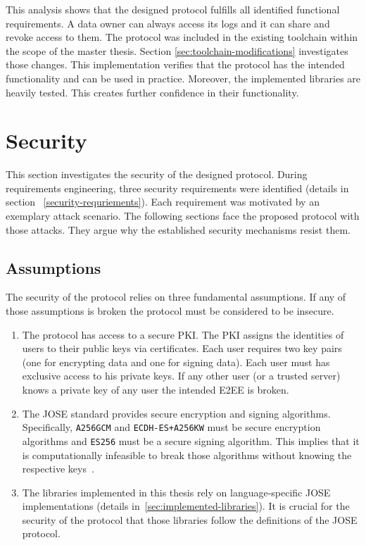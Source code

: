 \documentclass[../main.tex]{subfiles}
\begin{document}
This analysis shows that the designed protocol fulfills all identified functional requirements.
A data owner can always access its logs and it can share and revoke access to them.
The protocol was included in the existing toolchain within the scope of the master thesis.
Section \ref{sec:toolchain-modifications} investigates those changes.
This implementation verifies that the protocol has the intended functionality and can be used in practice.
Moreover, the implemented libraries are heavily tested.
This creates further confidence in their functionality.

\section{Security}
\label{sec:evaluation-sec}

This section investigates the security of the designed protocol.
During requirements engineering, three security requirements were identified (details in section ~\ref{security-requriements}).
Each requirement was motivated by an exemplary attack scenario.
The following sections face the proposed protocol with those attacks.
They argue why the established security mechanisms resist them.

\subsection{Assumptions}

The security of the protocol relies on three fundamental assumptions.
If any of those assumptions is broken the protocol must be considered to be insecure.

\begin{enumerate}
    \item 
    The protocol has access to a secure PKI.
    The PKI assigns the identities of users to their public keys via certificates.
    Each user requires two key pairs (one for encrypting data and one for signing data).
    Each user must has exclusive access to his private keys.
    If any other user (or a trusted server) knows a private key of any user the intended E2EE is broken.
    \item 
    The JOSE standard provides secure encryption and signing algorithms.
    Specifically, \verb|A256GCM| and \verb|ECDH-ES+A256KW| must be secure encryption algorithms and \verb|ES256| must be a secure signing algorithm.
    This implies that it is computationally infeasible to break those algorithms without knowing the respective keys~\cite{Katz2020}.
    \item 
    The libraries implemented in this thesis rely on language-specific JOSE implementations (details in~\ref{sec:implemented-libraries}).
    It is crucial for the security of the protocol that those libraries follow the definitions of the JOSE protocol.
\end{enumerate}
\end{document}
